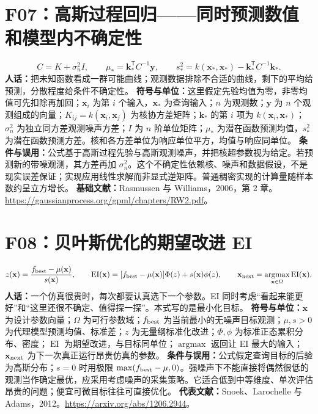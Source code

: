 \documentclass[UTF8,zihao=-4,openany,oneside,fontset=windows]{ctexbook}
\begin{document}
\section{F07：高斯过程回归——同时预测数值和模型内不确定性}
\begin{equation}
 C=K+\sigma_n^2I,\qquad
 \mu_*=\mathbf k_*^{\mathsf T}C^{-1}\mathbf y,\qquad
 s_*^2=k(\mathbf x_*,\mathbf x_*)-\mathbf k_*^{\mathsf T}C^{-1}\mathbf k_*.
\end{equation}
\textbf{人话：}把未知函数看成一群可能曲线；观测数据排除不合适的曲线，剩下的平均给预测，分散程度给条件不确定性。
\textbf{符号与单位：}这里假定先验均值为零，非零均值可先扣除再加回；$\mathbf x_i$ 为第 $i$ 个输入，$\mathbf x_*$ 为查询输入；$n$ 为观测数；$\mathbf y$ 为 $n$ 个观测组成的向量；$K_{ij}=k(\mathbf x_i,\mathbf x_j)$ 为核协方差矩阵；$\mathbf k_*$ 的第 $i$ 项为 $k(\mathbf x_i,\mathbf x_*)$；$\sigma_n^2$ 为独立同方差观测噪声方差；$I$ 为 $n$ 阶单位矩阵；$\mu_*$ 为潜在函数预测均值，$s_*^2$ 为潜在函数预测方差。核和各方差单位为响应单位平方，均值与响应同单位。
\textbf{条件与误用：}公式基于高斯过程先验与高斯观测噪声，并把核超参数视为给定。若预测新的带噪观测，其方差再加 $\sigma_n^2$。这个不确定性依赖核、噪声和数据假设，不是现实误差保证；实现应用线性求解而非显式逆矩阵。普通稠密实现的计算量随样本数约呈立方增长。
\textbf{基础文献：}Rasmussen 与 Williams，2006，第 2 章。\url{https://gaussianprocess.org/gpml/chapters/RW2.pdf}。

\section{F08：贝叶斯优化的期望改进 EI}
\begin{equation}
 z(\mathbf x)=\frac{f_{\rm best}-\mu(\mathbf x)}{s(\mathbf x)},\qquad
 \operatorname{EI}(\mathbf x)=
 [f_{\rm best}-\mu(\mathbf x)]\Phi(z)+s(\mathbf x)\phi(z),\qquad
 \mathbf x_{\rm next}=\underset{\mathbf x\in\Omega}{\operatorname{argmax}}\operatorname{EI}(\mathbf x).
\end{equation}
\textbf{人话：}一个仿真很贵时，每次都要认真选下一个参数。EI 同时考虑“看起来能更好”和“这里还很不确定、值得探一探”。本式写的是最小化目标。
\textbf{符号与单位：}$\mathbf x$ 为设计参数向量；$\Omega$ 为可行参数域；$f_{\rm best}$ 为当前最小的无噪声目标观测；$\mu,s>0$ 为代理模型预测均值、标准差；$z$ 为无量纲标准化改进；$\Phi,\phi$ 为标准正态累积分布、密度；$\operatorname{EI}$ 为期望改进，与目标同单位；$\operatorname{argmax}$ 返回让 EI 最大的输入；$\mathbf x_{\rm next}$ 为下一次真正运行昂贵仿真的参数。
\textbf{条件与误用：}公式假定查询目标的后验为高斯分布；$s=0$ 时用极限 $\max(f_{\rm best}-\mu,0)$。强噪声下不能直接将偶然很低的观测当作确定最优，应采用考虑噪声的采集策略。它适合低到中等维度、单次评估昂贵的问题；便宜可微目标往往可直接优化。
\textbf{代表文献：}Snoek、Larochelle 与 Adams，2012。\url{https://arxiv.org/abs/1206.2944}。
\end{document}
